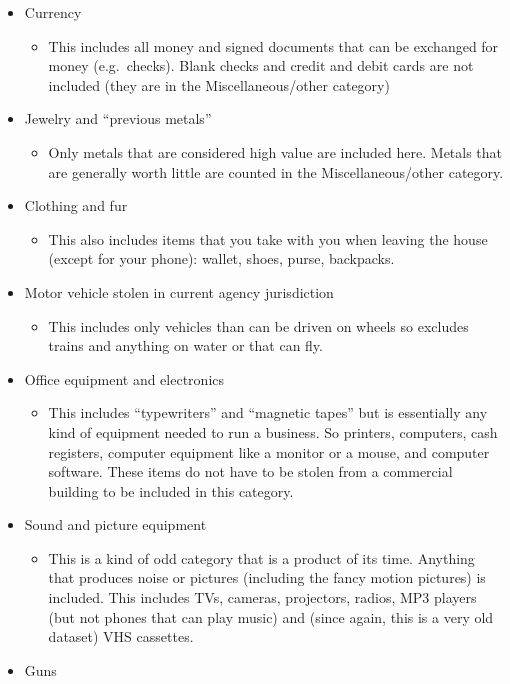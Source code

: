\documentclass[
  12pt,
  openany]{book}
\providecommand{\tightlist}{%
  \setlength{\itemsep}{0pt}\setlength{\parskip}{0pt}}
\begin{document}
\begin{itemize}
\tightlist
\item
  Currency

  \begin{itemize}
  \tightlist
  \item
    This includes all money and signed documents that can be exchanged for money (e.g.~checks). Blank checks and credit and debit cards are not included (they are in the Miscellaneous/other category)
  \end{itemize}
\item
  Jewelry and ``previous metals''

  \begin{itemize}
  \tightlist
  \item
    Only metals that are considered high value are included here. Metals that are generally worth little are counted in the Miscellaneous/other category.
  \end{itemize}
\item
  Clothing and fur

  \begin{itemize}
  \tightlist
  \item
    This also includes items that you take with you when leaving the house (except for your phone): wallet, shoes, purse, backpacks.
  \end{itemize}
\item
  Motor vehicle stolen in current agency jurisdiction

  \begin{itemize}
  \tightlist
  \item
    This includes only vehicles than can be driven on wheels so excludes trains and anything on water or that can fly.
  \end{itemize}
\item
  Office equipment and electronics

  \begin{itemize}
  \tightlist
  \item
    This includes ``typewriters'' and ``magnetic tapes'' but is essentially any kind of equipment needed to run a business. So printers, computers, cash registers, computer equipment like a monitor or a mouse, and computer software. These items do not have to be stolen from a commercial building to be included in this category.
  \end{itemize}
\item
  Sound and picture equipment

  \begin{itemize}
  \tightlist
  \item
    This is a kind of odd category that is a product of its time. Anything that produces noise or pictures (including the fancy motion pictures) is included. This includes TVs, cameras, projectors, radios, MP3 players (but not phones that can play music) and (since again, this is a very old dataset) VHS cassettes.
  \end{itemize}
\item
  Guns


\end{itemize}
\end{document}
